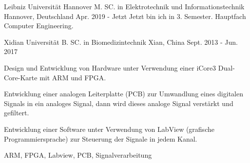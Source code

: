 

\begin{cventries}

	\cventry
	{Leibniz Universität Hannover} %
	{M. SC. in Elektrotechnik und Informationstechnik} %
	{Hannover, Deutschland} %
	{Apr. 2019 - Jetzt} %
	{Jetzt bin ich in 3. Semester. Hauptfach Computer Engineering.}
	{}

  \cventry
  	{Xidian Universität} %
    {B. SC. in Biomedizintechnik} %
    {Xian, China} %
    {Sept. 2013 - Jun. 2017} %
    {
      \begin{cvitems} %
        \item {Design und Entwicklung von Hardware unter Verwendung einer iCore3 Dual-Core-Karte mit ARM und FPGA.}
        \item { Entwicklung einer analogen Leiterplatte (PCB) zur Umwandlung eines digitalen Signals in ein analoges Signal, dann wird dieses analoge Signal verstärkt und gefiltert.}
        \item {Entwicklung einer Software unter Verwendung von LabView (grafische Programmiersprache) zur Steuerung der Signale in jedem Kanal.}
      \end{cvitems}
    }
	{ARM, FPGA, Labview, PCB, Signalverarbeitung}

	\vspace{-2.0mm}

\end{cventries}

